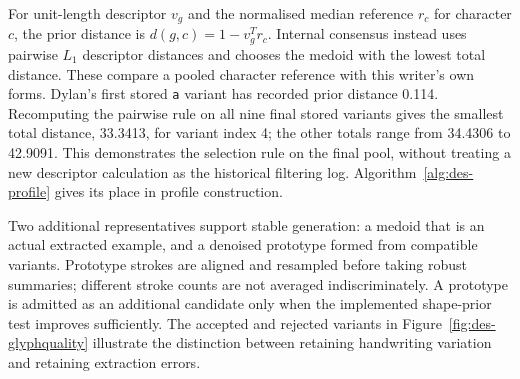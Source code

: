For unit-length descriptor $v_g$ and the normalised median reference $r_c$ for character $c$, the prior distance is $d(g,c)=1-v_g^Tr_c$. Internal consensus instead uses pairwise $L_1$ descriptor distances and chooses the medoid with the lowest total distance. These compare a pooled character reference with this writer's own forms. Dylan's first stored \texttt{a} variant has recorded prior distance 0.114. Recomputing the pairwise rule on all nine final stored variants gives the smallest total distance, 33.3413, for variant index 4; the other totals range from 34.4306 to 42.9091. This demonstrates the selection rule on the final pool, without treating a new descriptor calculation as the historical filtering log. Algorithm~\ref{alg:des-profile} gives its place in profile construction.


\begin{designalgorithm}
\caption{Labelled handwriting to a persistent writer profile}
\label{alg:des-profile}
\begin{designpseudo}
\end{designpseudo}
\end{designalgorithm}

Two additional representatives support stable generation: a medoid that is an actual extracted example, and a denoised prototype formed from compatible variants. Prototype strokes are aligned and resampled before taking robust summaries; different stroke counts are not averaged indiscriminately. A prototype is admitted as an additional candidate only when the implemented shape-prior test improves sufficiently. The accepted and rejected variants in Figure~\ref{fig:des-glyphquality} illustrate the distinction between retaining handwriting variation and retaining extraction errors.



